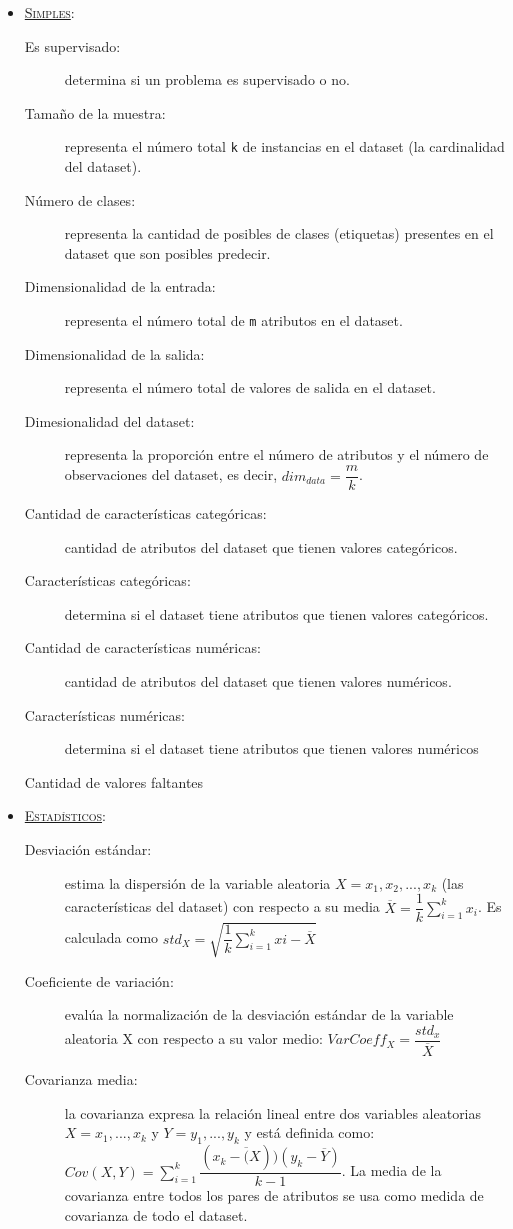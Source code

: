 \begin{itemize}
	\item \underline{\textsc{Simples}}: \begin{description}
		\item[Es supervisado:] determina si un problema es supervisado o no.
		\item[Tamaño de la muestra:] representa el número total \texttt{k} de instancias en el dataset (la cardinalidad del dataset).
		\item[Número de clases:] representa la cantidad de posibles de clases (etiquetas) presentes en el dataset que son posibles predecir.
		\item[Dimensionalidad de la entrada:] representa el número total de \texttt{m} atributos en el dataset.
		\item[Dimensionalidad de la salida:] representa el número total de valores de salida en el dataset.
		\item[Dimesionalidad del dataset:] representa la proporción entre el número de atributos y el número de observaciones del dataset, es decir, $dim_{data} = \dfrac{m}{k}$.
		\item[Cantidad de características categóricas:] cantidad de atributos del dataset que tienen valores categóricos.
		\item[Características categóricas:] determina si el dataset tiene atributos que tienen valores categóricos.
		\item[Cantidad de características numéricas:] cantidad de atributos del dataset que tienen valores numéricos.
		\item[Características numéricas:] determina si el dataset tiene atributos que tienen valores numéricos
		\item[Cantidad de valores faltantes]
	\end{description}
	\item \underline{\textsc{Estadísticos}}: \begin{description}
		\item[Desviación estándar:] estima la dispersión de la variable aleatoria $X = x_1, x_2, ..., x_k$ (las características del dataset) con respecto a su media $\overline{X} = \dfrac{1}{k}\sum^k_{i=1}x_i$. Es calculada como $std_X = \sqrt{\dfrac{1}{k}\sum^k_{i=1}xi - \overline{X}}$
		\item[Coeficiente de variación:] evalúa la normalización de la desviación estándar de la variable aleatoria X con respecto a su valor medio: $VarCoeff_X =  \dfrac{std_x}{\overline{X}}$
		\item[Covarianza media:] la covarianza expresa la relación lineal entre dos variables aleatorias $X = x_1, ..., x_k$ y $Y = y_1, ..., y_k$ y está definida como: $Cov(X, Y) = \sum^k_{i=1} \dfrac{(x_k - \overline(X))(y_k - \overline{Y})}{k-1}$. La media de la covarianza entre todos los pares de atributos se usa como medida de covarianza de todo el dataset.

\end{description}
\end{itemize}
